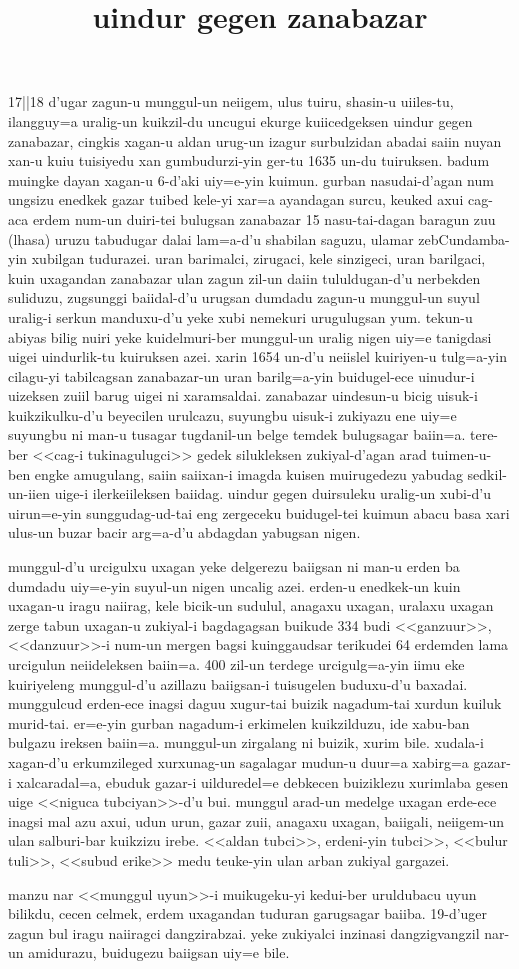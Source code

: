 \documentclass[a4paper,10pt]{article}
\begin{document}
\title{uindur gegen zanabazar}
\date{}
\maketitle

17||18 d'ugar zagun-u munggul-un neiigem, ulus tuiru, shasin-u
uiiles-tu, ilangguy=a uralig-un kuikzil-du uncugui ekurge
kuiicedgeksen uindur gegen zanabazar, cingkis xagan-u aldan
urug-un izagur surbulzidan abadai saiin nuyan xan-u kuiu
tuisiyedu xan gumbudurzi-yin ger-tu 1635 un-du tuiruksen.
badum muingke dayan xagan-u 6-d'aki uiy=e-yin kuimun. gurban
nasudai-d'agan num ungsizu enedkek gazar tuibed kele-yi xar=a
ayandagan surcu, keuked axui cag-aca erdem num-un duiri-tei
bulugsan zanabazar 15 nasu-tai-dagan baragun zuu (lhasa)
uruzu tabudugar dalai lam=a-d'u shabilan saguzu, ulamar
zebCundamba-yin xubilgan tudurazei. uran barimalci, zirugaci,
kele sinzigeci, uran barilgaci, kuin uxagandan zanabazar ulan
zagun zil-un daiin tululdugan-d'u nerbekden suliduzu, zugsunggi
baiidal-d'u urugsan dumdadu zagun-u munggul-un suyul uralig-i
serkun manduxu-d'u yeke xubi nemekuri urugulugsan yum. tekun-u
abiyas bilig nuiri yeke kuidelmuri-ber munggul-un uralig nigen
uiy=e tanigdasi uigei uindurlik-tu kuiruksen azei. xarin 1654
un-d'u neiislel kuiriyen-u tulg=a-yin cilagu-yi tabilcagsan
zanabazar-un uran barilg=a-yin buidugel-ece uinudur-i uizeksen
zuiil barug uigei ni xaramsaldai. zanabazar uindesun-u bicig
uisuk-i kuikzikulku-d'u beyecilen urulcazu, suyungbu uisuk-i
zukiyazu ene uiy=e suyungbu ni man-u tusagar tugdanil-un belge
temdek bulugsagar baiin=a.  tere-ber <<cag-i tukinagulugci>>
gedek silukleksen zukiyal-d'agan arad tuimen-u-ben engke
amugulang, saiin saiixan-i imagda kuisen muirugedezu yabudag
sedkil-un-iien uige-i ilerkeiileksen baiidag. uindur gegen
duirsuleku uralig-un xubi-d'u uirun=e-yin sunggudag-ud-tai
eng zergeceku buidugel-tei kuimun abacu basa xari ulus-un
buzar bacir arg=a-d'u abdagdan yabugsan nigen.

munggul-d'u urcigulxu uxagan yeke delgerezu baiigsan ni man-u
erden ba dumdadu uiy=e-yin suyul-un nigen uncalig azei. erden-u
enedkek-un kuin uxagan-u iragu naiirag, kele bicik-un sudulul,
anagaxu uxagan, uralaxu uxagan zerge tabun uxagan-u zukiyal-i
bagdagagsan buikude 334 budi <<ganzuur>>, <<danzuur>>-i num-un
mergen bagsi kuinggaudsar terikudei 64 erdemden lama urcigulun
neiideleksen baiin=a. 400 zil-un terdege urcigulg=a-yin iimu
eke kuiriyeleng munggul-d'u azillazu baiigsan-i tuisugelen
buduxu-d'u baxadai. munggulcud erden-ece  inagsi daguu
xugur-tai buizik nagadum-tai xurdun kuiluk murid-tai. er=e-yin
gurban nagadum-i erkimelen kuikzilduzu, ide xabu-ban
bulgazu ireksen baiin=a.  munggul-un zirgalang ni buizik,
xurim bile. xudala-i  xagan-d'u erkumzileged xurxunag-un
sagalagar mudun-u duur=a xabirg=a gazar-i xalcaradal=a, ebuduk
gazar-i uilduredel=e debkecen buiziklezu xurimlaba gesen uige
<<niguca tubciyan>>-d'u bui. munggul arad-un medelge uxagan
erde-ece inagsi mal azu axui, udun urun, gazar zuii, anagaxu
uxagan, baiigali, neiigem-un ulan salburi-bar kuikzizu irebe.
<<aldan tubci>>, erdeni-yin tubci>>, <<bulur tuli>>, <<subud
erike>> medu teuke-yin ulan arban zukiyal gargazei.

manzu nar <<munggul uyun>>-i muikugeku-yi kedui-ber uruldubacu
uyun bilikdu, cecen celmek, erdem uxagandan tuduran garugsagar
baiiba.  19-d'uger zagun bul iragu naiiragci dangzirabzai. yeke
zukiyalci inzinasi dangzigvangzil nar-un amidurazu, buidugezu
baiigsan uiy=e bile.
\end{document}
